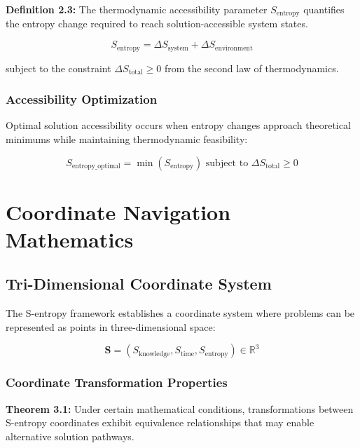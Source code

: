\documentclass[11pt]{article}
\begin{document}
\textbf{Definition 2.3:} The thermodynamic accessibility parameter $S_{\text{entropy}}$ quantifies the entropy change required to reach solution-accessible system states.

\begin{equation}
S_{\text{entropy}} = \Delta S_{\text{system}} + \Delta S_{\text{environment}}
\label{eq:thermodynamic_accessibility}
\end{equation}

subject to the constraint $\Delta S_{\text{total}} \geq 0$ from the second law of thermodynamics.

\subsubsection{Accessibility Optimization}

Optimal solution accessibility occurs when entropy changes approach theoretical minimums while maintaining thermodynamic feasibility:

\begin{equation}
S_{\text{entropy\_optimal}} = \min\left(S_{\text{entropy}}\right) \text{ subject to } \Delta S_{\text{total}} \geq 0
\label{eq:entropy_optimization}
\end{equation}

\section{Coordinate Navigation Mathematics}

\subsection{Tri-Dimensional Coordinate System}

The S-entropy framework establishes a coordinate system where problems can be represented as points in three-dimensional space:

\begin{equation}
\mathbf{S} = (S_{\text{knowledge}}, S_{\text{time}}, S_{\text{entropy}}) \in \mathbb{R}^3
\label{eq:tri_dimensional_coordinates}
\end{equation}

\subsubsection{Coordinate Transformation Properties}

\textbf{Theorem 3.1:} Under certain mathematical conditions, transformations between S-entropy coordinates exhibit equivalence relationships that may enable alternative solution pathways.
\end{document}
